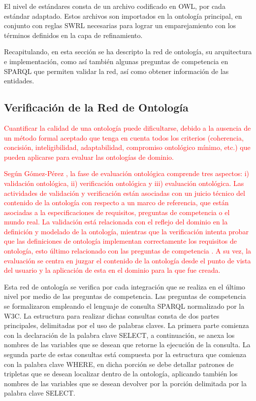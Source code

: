 \documentclass[journal]{IEEEtran}
\begin{document}
El nivel de est\'andares consta de un archivo codificado en OWL, por cada est\'andar adaptado. Estos archivos son importados en la ontolog\'ia principal, en conjunto con reglas SWRL necesarias para lograr un emparejamiento con los t\'erminos definidos en la capa de refinamiento.

Recapitulando, en esta secci\'on se ha descripto la red de ontolog\'ia, su arquitectura e implementaci\'on, como as\'i tambi\'en algunas preguntas de competencia en SPARQL que permiten validar la red, as\'i como obtener informaci\'on de las entidades. 



\subsection{Verificaci\'on de la Red de Ontolog\'ia}

\textcolor{red}{Cuantificar la calidad de una ontolog\'ia puede dificultarse, debido a la ausencia de un método formal aceptado que tenga en cuenta todos los criterios (coherencia, concisi\'on, inteligibilidad, adaptabilidad, compromiso ontol\'ogico m\'inimo, etc.) que pueden aplicarse para evaluar las ontolog\'ias de dominio.}

\textcolor{red}{Seg\'un G\'omez-P\'erez \cite{Gomez-Perez2007OntologicalWeb}, la fase de evaluaci\'on ontol\'ogica comprende tres aspectos: i) validaci\'on ontol\'ogica, ii) verificaci\'on ontol\'ogica y iii) evaluaci\'on ontol\'ogica. Las actividades de validaci\'on y verificaci\'on est\'an asociadas con un juicio t\'ecnico del contenido de la ontolog\'ia con respecto a un marco de referencia, que est\'an asociadas a la especificaciones de requisitos, preguntas de competencia o el mundo real. La validaci\'on est\'a relacionada con el reflejo del dominio en la definici\'on y modelado de la ontolog\'ia, mientras que la verificaci\'on intenta probar que las definiciones de ontolog\'ia implementan correctamente los requisitos de ontolog\'ia, esto \'ultimo relacionado con las preguntas de competencia \cite{Bezerra2013EvaluatingQuestions}. A su vez, la evaluaci\'on se centra en juzgar el contenido de la ontolog\'ia desde el punto de vista del usuario y la aplicaci\'on de esta en el dominio para la que fue creada. }

Esta red de ontolog\'ia se verifica por cada integraci\'on que se realiza en el \'ultimo nivel por medio de las preguntas de competencia. Las preguntas de competencia se formalizaron empleando el lenguaje de consulta SPARQL normalizado por la W3C. La estructura para realizar dichas consultas consta de dos partes principales, delimitadas por el uso de palabras claves. La primera parte comienza con la declaraci\'on de la palabra clave SELECT, a continuaci\'on, se anexa los nombres de las variables que se desean que retorne la ejecuci\'on de la consulta. La segunda parte de estas consultas est\'a compuesta por la estructura que comienza con la palabra clave WHERE, en dicha porci\'on se debe detallar patrones de tripletas que se desean localizar dentro de la ontolog\'ia, aplicando tambi\'en los nombres de las variables que se desean devolver por la porci\'on delimitada por la palabra clave SELECT. 
\end{document}
